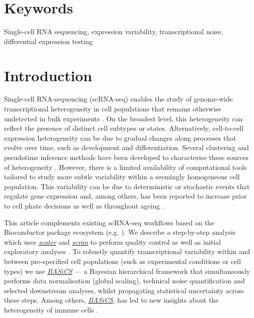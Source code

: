 \documentclass[9pt,a4paper,]{extarticle}
\begin{document}
\section*{Keywords}
Single-cell RNA sequencing, expression variability, transcriptional noise, differential expression testing


\clearpage
\pagestyle{main}

\hypertarget{introduction}{%
\section{Introduction}\label{introduction}}

Single-cell RNA-sequencing (scRNA-seq) enables the study of genome-wide
transcriptional heterogeneity in cell populations that remains otherwise
undetected in bulk experiments \citep{Stegle2015, Prakadan2017, Patange2018}.
On the broadest level, this heterogeneity can reflect the presence of distinct
cell subtypes or states.
Alternatively, cell-to-cell expression heterogeneity can be due to gradual
changes along processes that evolve over time, such as development and differentiation.
Several clustering and pseudotime inference methods have been developed to
characterise these sources of heterogeneity \citep{Kiselev2019, Saelens2019}.
However, there is a limited availability of computational tools tailored
to study more subtle variability within a seemingly homogeneous cell population.
This variability can be due to deterministic or stochastic events that regulate gene expression and, among others, has been reported to increase prior to cell phate decisions \citep{Mojtahedi2016} as well as throughout ageing \citep{Martinez-jimenez2017}.

This article complements existing scRNA-seq workflows based on the
Bioconductor package ecosystem (e.g. \citep{Lun2016, Kim2019}).
We describe a step-by-step analysis which uses \emph{\href{https://bioconductor.org/packages/3.11/scater}{scater}} and
\emph{\href{https://bioconductor.org/packages/3.11/scran}{scran}} to perform quality control as well as
initial exploratory analyses \citep{McCarthy2017, Lun2016}.
To robustly quantify transcriptional variability within and
between pre-specified cell populations (such as experimental conditions or
cell types) we use \emph{\href{https://bioconductor.org/packages/3.11/BASiCS}{BASiCS}} \citep{Vallejos2015, Vallejos2016, Eling2017} --- a Bayesian hierarchical framework that simultaneously performs
data normalisation (global scaling), technical noise quantification and selected
downstream analyses, whilst propagating statistical uncertainty across these
steps. Among others, \emph{\href{https://bioconductor.org/packages/3.11/BASiCS}{BASiCS}}, has led to new insights about the
heterogeneity of immune cells \citep{Martinez-jimenez2017}.
\end{document}
